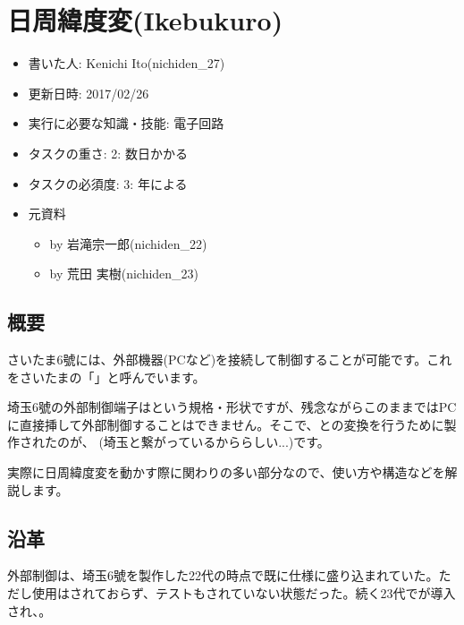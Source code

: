 \documentclass[letterpaper,10pt,dvipdfmx]{sphinxmanual}
\begin{document}
\chapter{日周緯度変(Ikebukuro)}
\label{\detokenize{nissyu-idohen/ikebukuro:ikebukuro}}\label{\detokenize{nissyu-idohen/ikebukuro::doc}}\begin{itemize}
\item {} 
書いた人: Kenichi Ito(nichiden\_27)

\item {} 
更新日時: 2017/02/26

\item {} 
実行に必要な知識・技能: 電子回路

\item {} 
タスクの重さ: 2: 数日かかる

\item {} 
タスクの必須度: 3: 年による

\item {} 
元資料
\begin{itemize}
\item {} 
 by 岩滝宗一郎(nichiden\_22)

\item {} 
 by 荒田 実樹(nichiden\_23)

\end{itemize}

\end{itemize}


\section{概要}
\label{\detokenize{nissyu-idohen/ikebukuro:}}\label{\detokenize{nissyu-idohen/ikebukuro:id1}}

さいたま6號には、外部機器(PCなど)を接続して制御することが可能です。これをさいたまの「」と呼んでいます。

埼玉6號の外部制御端子はという規格・形状ですが、残念ながらこのままではPCに直接挿して外部制御することはできません。そこで、との変換を行うために製作されたのが、 (埼玉と繋がっているかららしい...)です。

実際に日周緯度変を動かす際に関わりの多い部分なので、使い方や構造などを解説します。


\section{沿革}
\label{\detokenize{nissyu-idohen/ikebukuro:}}\label{\detokenize{nissyu-idohen/ikebukuro:id2}}
外部制御は、埼玉6號を製作した22代の時点で既に仕様に盛り込まれていた。ただし使用はされておらず、テストもされていない状態だった。続く23代でが導入され、。
\end{document}
